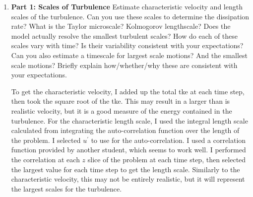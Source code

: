 \documentclass[11pt]{article}
\begin{document}
\begin{enumerate}

    \item \textbf{Part 1: Scales of Turbulence} Estimate characteristic velocity and length scales of the turbulence. Can you use these scales to determine the dissipation rate? What is the Taylor microscale? Kolmogorov lengthscale? Does the model actually resolve the smallest turbulent scales? How do each of these scales vary with time? Is their variability consistent with your expectations? Can you also estimate a timescale for largest scale motions? And the smallest scale motions? Briefly explain how/whether/why these are consistent with your expectations.\par
    
	To get the characteristic velocity, I added up the total tke at each time step, then took the square root of the tke. This may result in a larger than is realistic velocity, but it is a good measure of the energy contained in the turbulence. For the characteristic length scale, I used the integral length scale calculated from integrating the auto-correlation function over the length of the problem. I selected $u^{\prime}$ to use for the auto-correlation. I used a correlation function provided by another student, which seems to work well. I performed the correlation at each $z$ slice of the problem at each time step, then selected the largest value for each time step to get the length scale. Similarly to the characteristic velocity, this may not be entirely realistic, but it will represent the largest scales for the turbulence.

\end{enumerate}
\end{document}

